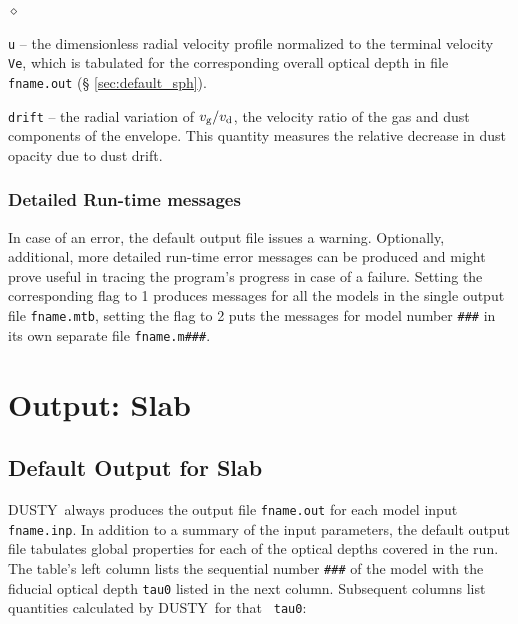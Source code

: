 \documentclass[11pt]{article}
\def\D    {{\sf DUSTY}}
\begin{document}
\begin{list}{$\diamond$}{}
\item {\tt u} -- the dimensionless radial velocity profile normalized
  to the terminal velocity {\tt Ve}, which is tabulated for the
  corresponding overall optical depth in file {\tt fname.out} (\S
  \ref{sec:default_sph}).
\item {\tt drift} -- the radial variation of $v_{\rm g}/v_{\rm d}$,
  the velocity ratio of the gas and dust components of the envelope.
  This quantity measures the relative decrease in dust opacity due to
  dust drift.

\end{list}

\subsubsection{Detailed Run-time messages}
\label{sec:error_sph}

In case of an error, the default output file issues a warning. Optionally,
additional, more detailed run-time error messages can be produced and might
prove useful in tracing the program's progress in case of a failure. Setting
the corresponding flag to 1 produces messages for all the models in the single
output file {\tt fname.mtb}, setting the flag to 2 puts the messages for model
number {\tt \#\#\#} in its own separate file {\tt fname.m\#\#\#}.


\section{Output: Slab}
\label{sec:output_slb}

\subsection{Default Output for Slab}
\label{sec:default_slb}

\D\ always produces the output file {\tt fname.out} for each model
input {\tt fname.inp}. In addition to a summary of the input
parameters, the default output file tabulates global properties for
each of the optical depths covered in the run. The table's left column
lists the sequential number {\tt \#\#\#} of the model with the
fiducial optical depth {\tt tau0} listed in the next column.
Subsequent columns list quantities calculated by \D\ for that {\tt
  tau0}:
\end{document}
